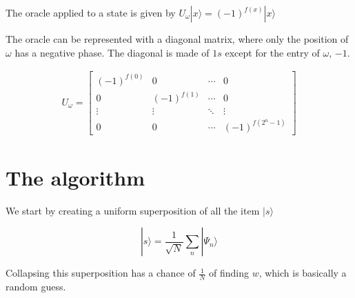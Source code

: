 \documentclass{article}
\begin{document}
The oracle applied to a state is given by \(U_\omega|x\rangle ={(-1)}^{f(x)}|x\rangle\)

The oracle can be represented with a diagonal matrix, where only the position of \(\omega\) has a negative phase.
The diagonal is made of \(1s\) except for the entry of \(\omega\), \(-1\).

\begin{align*}
    U_\omega=
    \begin{bmatrix}
        {(-1)}^{f(0)} & 0 & \cdots & 0 \\
        0 & {(-1)}^{f(1)} & \cdots & 0 \\
        \vdots & \vdots & \ddots & \vdots \\
        0 & 0 & \cdots & {(-1)}^{f(2^n-1)}
    \end{bmatrix}
\end{align*}

\section{The algorithm}

We start by creating a uniform superposition of all the item \(|s\rangle\)

\[
    |s\rangle=\frac{1}{\sqrt{N}}\sum_{n}|\Psi_n\rangle
\]

Collapsing this superposition has a chance of \(\frac{1}{N}\) of finding \(w\), which is basically a random guess.
\end{document}
